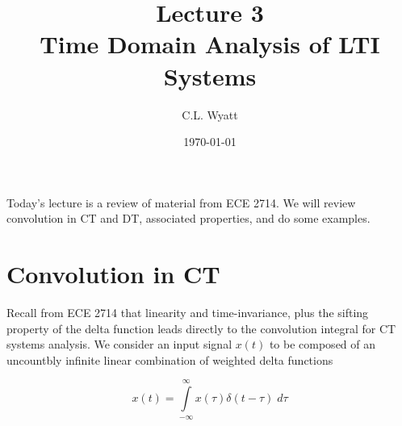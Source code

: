\documentclass{article}
\begin{document}
\title{Lecture 3\\ Time Domain Analysis of LTI Systems}
\author{C.L. Wyatt}
\date{\today}
\maketitle

Today's lecture is a review of material from ECE 2714. We will review convolution in CT and DT, associated properties, and do some examples.

\section{Convolution in CT}

Recall from ECE 2714 that linearity and time-invariance, plus the sifting property of the delta function leads directly to the convolution integral for CT systems analysis. We consider an input signal $x(t)$ to be composed of an uncountbly infinite linear combination of weighted delta functions 

\begin{equation}
  x(t) = \int\limits_{-\infty}^{\infty} x(\tau)\delta(t-\tau)\; d\tau
\end{equation}
\end{document}
